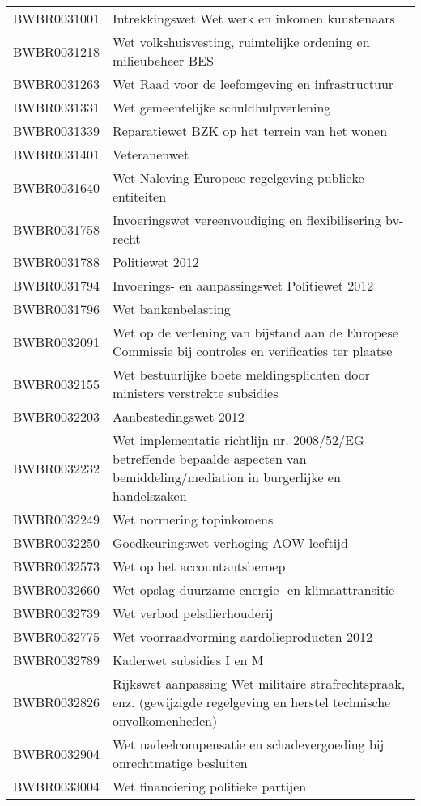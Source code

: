 \begin{longtable}{lp{}}
BWBR0031001 & Intrekkingswet Wet werk en inkomen kunstenaars \\
BWBR0031218 & Wet volkshuisvesting, ruimtelijke ordening en milieubeheer BES \\
BWBR0031263 & Wet Raad voor de leefomgeving en infrastructuur \\
BWBR0031331 & Wet gemeentelijke schuldhulpverlening \\
BWBR0031339 & Reparatiewet BZK op het terrein van het wonen \\
BWBR0031401 & Veteranenwet \\
BWBR0031640 & Wet Naleving Europese regelgeving publieke entiteiten \\
BWBR0031758 & Invoeringswet vereenvoudiging en flexibilisering bv-recht \\
BWBR0031788 & Politiewet 2012 \\
BWBR0031794 & Invoerings- en aanpassingswet Politiewet 2012 \\
BWBR0031796 & Wet bankenbelasting \\
BWBR0032091 & Wet op de verlening van bijstand aan de Europese Commissie bij controles en verificaties ter plaatse \\
BWBR0032155 & Wet bestuurlijke boete meldingsplichten door ministers verstrekte subsidies  \\
BWBR0032203 & Aanbestedingswet 2012 \\
BWBR0032232 & Wet implementatie richtlijn nr. 2008/52/EG betreffende bepaalde aspecten van bemiddeling/mediation in burgerlijke en handelszaken \\
BWBR0032249 & Wet normering topinkomens \\
BWBR0032250 & Goedkeuringswet verhoging AOW-leeftijd \\
BWBR0032573 & Wet op het accountantsberoep \\
BWBR0032660 & Wet opslag duurzame energie- en klimaattransitie \\
BWBR0032739 & Wet verbod pelsdierhouderij  \\
BWBR0032775 & Wet voorraadvorming aardolieproducten 2012 \\
BWBR0032789 & Kaderwet subsidies I en M \\
BWBR0032826 & Rijkswet aanpassing Wet militaire strafrechtspraak, enz. (gewijzigde regelgeving en herstel technische onvolkomenheden) \\
BWBR0032904 & Wet nadeelcompensatie en schadevergoeding bij onrechtmatige besluiten  \\
BWBR0033004 & Wet financiering politieke partijen  \\

\end{longtable}
